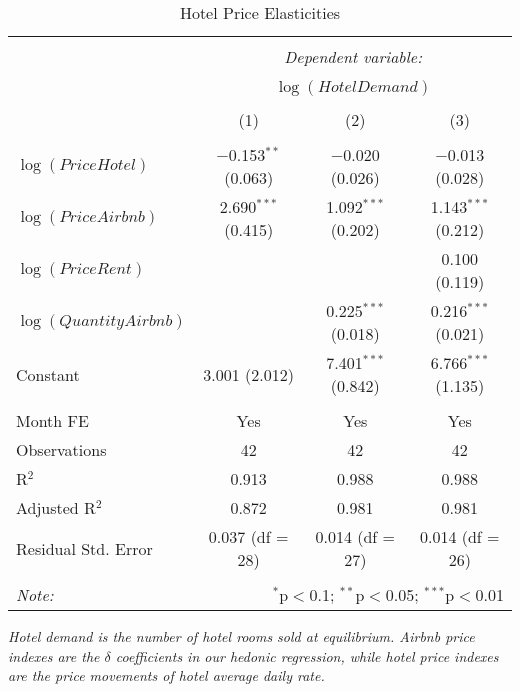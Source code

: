\documentclass[12pt]{article}
\begin{document}
		\begin{table}[!htbp]  %
			\begin{center}
  				\caption{Hotel Price Elasticities}
				\label{tab:HotelPriceElasticity}
				\begin{tabular}{@{\extracolsep{5pt}}lccc} 
					\\[-1.8ex]\hline 
					\hline \\[-1.8ex] 
 					& \multicolumn{3}{c}{\textit{Dependent variable:}} \\ 
					\cline{2-4} 
					\\[-1.8ex] & \multicolumn{3}{c}{$\log(HotelDemand)$} \\ 
					\\[-1.8ex] & (1) & (2) & (3)\\ 
					\hline \\[-1.8ex] 
 					$\log(PriceHotel)$ & $-$0.153$^{**}$ (0.063) & $-$0.020 (0.026) & $-$0.013 (0.028) \\ 
  					$\log(PriceAirbnb)$ & 2.690$^{***}$ (0.415) & 1.092$^{***}$ (0.202) & 1.143$^{***}$ (0.212) \\ 
  					$\log(PriceRent)$ &  &  & 0.100 (0.119) \\ 
  					$\log(QuantityAirbnb)$ &  & 0.225$^{***}$ (0.018) & 0.216$^{***}$ (0.021) \\ 
  					Constant & 3.001 (2.012) & 7.401$^{***}$ (0.842) & 6.766$^{***}$ (1.135) \\ 
 					\hline \\[-1.8ex] 
 					Month FE & Yes & Yes & Yes\\
					Observations & 42 & 42 & 42 \\ 
					R$^{2}$ & 0.913 & 0.988 & 0.988 \\ 
					Adjusted R$^{2}$ & 0.872 & 0.981 & 0.981 \\ 
					Residual Std. Error & 0.037 (df = 28) & 0.014 (df = 27) & 0.014 (df = 26) \\ 
					\hline 
					\hline \\[-1.8ex] 
					\textit{Note:}  & \multicolumn{3}{r}{$^{*}$p$<$0.1; $^{**}$p$<$0.05; $^{***}$p$<$0.01} \\ 
				\end{tabular} 
			\end{center}
			\emph{Hotel demand is the number of hotel rooms sold at equilibrium. Airbnb price indexes are the $\delta$ coefficients in our hedonic regression, while hotel price indexes are the price movements of hotel average daily rate.}
		\end{table}		 
		
\end{document}
